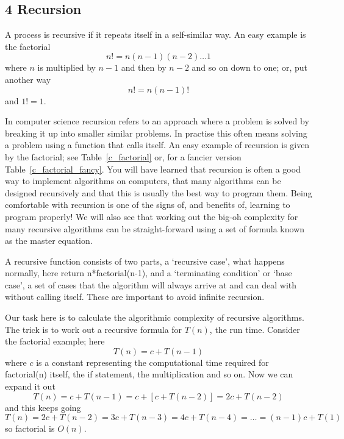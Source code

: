 \documentclass[11pt,a4paper]{scrartcl}
\begin{document}
\subsection*{4 Recursion}

A process is recursive if it repeats itself in a self-similar way. An
easy example is the factorial
\begin{equation}
n!=n(n-1)(n-2)\ldots 1
\end{equation}
where $n$ is multiplied by $n-1$ and then by $n-2$ and so on down to one; or, put another way
\begin{equation}
n!=n(n-1)!
\end{equation}
and $1!=1$.

In computer science recursion refers to an approach where a problem is
solved by breaking it up into smaller similar problems. In practise
this often means solving a problem using a function that calls
itself. An easy example of recursion is given by the factorial; see
Table~\ref{c_factorial} or, for a fancier version
Table~\ref{c_factorial_fancy}. You will have learned that recursion is
often a good way to implement algorithms on computers, that many
algorithms can be designed recursively and that this is usually the
best way to program them. Being comfortable with recursion is one of
the signs of, and benefits of, learning to program properly! We will
also see that working out the big-oh complexity for many recursive
algorithms can be straight-forward using a set of formula known as
the master equation.

A recursive function consists of two parts, a \lq{}recursive
case\rq{}, what happens normally, here return n*factorial(n-1), and a
\lq{}terminating condition\rq{} or \lq{}base case\rq{}, a set of cases
that the algorithm will always arrive at and can deal with without
calling itself. These are important to avoid infinite recursion.

Our task here is to calculate the algorithmic complexity of recursive
algorithms. The trick is to work out a recursive formula for $T(n)$,
the run time. Consider the factorial example; here
\begin{equation}
T(n)=c+T(n-1)
\end{equation}
where $c$ is a constant representing the computational time required
for factorial(n) itself, the if statement, the multiplication and so
on. Now we can expand it out
\begin{equation}
T(n)=c+T(n-1)=c+[c+T(n-2)]=2c+T(n-2)
\end{equation}
and this keeps going
\begin{equation}
T(n)=2c+T(n-2)=3c+T(n-3)=4c+T(n-4)=\ldots = (n-1)c+T(1)
\end{equation}
so factorial is $O(n)$. 
\end{document}
